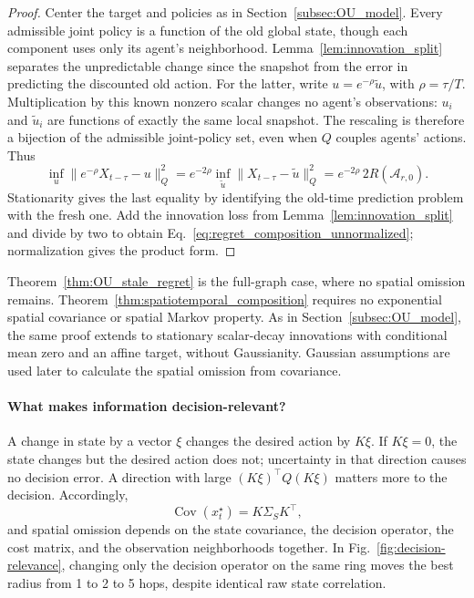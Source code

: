 \documentclass[11pt]{article}
\begin{document}
\begin{proof}
Center the target and policies as in Section~\ref{subsec:OU_model}.
Every admissible joint policy is a function of the old global state, though
each component uses only its agent's neighborhood. Lemma~\ref{lem:innovation_split}
separates the unpredictable change since the snapshot from the error in
predicting the discounted old action. For the latter, write
$u=e^{-\rho}\widetilde u$, with $\rho=\tau/T$. Multiplication by this
known nonzero scalar changes no agent's observations: $u_i$ and
$\widetilde u_i$ are functions of exactly the same local snapshot.
The rescaling is therefore a bijection of the admissible joint-policy set,
even when $Q$ couples agents' actions. Thus
\[
\inf_u\|e^{-\rho}X_{t-\tau}-u\|_Q^2
=e^{-2\rho}\inf_{\widetilde u}\|X_{t-\tau}-\widetilde u\|_Q^2
=e^{-2\rho}\,2R(\mathcal A_{r,0}).
\]
Stationarity gives the last equality by identifying the old-time prediction
problem with the fresh one. Add the innovation loss from Lemma~\ref{lem:innovation_split}
and divide by two to obtain Eq.~\eqref{eq:regret_composition_unnormalized};
normalization gives the product form.
\end{proof}

Theorem~\ref{thm:OU_stale_regret} is the full-graph case, where no spatial
omission remains. Theorem~\ref{thm:spatiotemporal_composition} requires no
exponential spatial covariance or spatial Markov property. As in Section~\ref{subsec:OU_model},
the same proof extends to stationary scalar-decay innovations with conditional
mean zero and an affine target, without Gaussianity. Gaussian assumptions
are used later to calculate the spatial omission from covariance.

\paragraph{What makes information decision-relevant?}
\label{subsec:decision_relevant_smoothness}
A change in state by a vector $\xi$ changes the desired action by $K\xi$.
If $K\xi=0$, the state changes but the desired action does not; uncertainty
in that direction causes no decision error. A direction with large
$(K\xi)^\top Q(K\xi)$ matters more to the decision. Accordingly,
\begin{equation}
\operatorname{Cov}(x_t^\star)=K\Sigma_S K^\top,
\label{eq:decision_covariance}
\end{equation}
and spatial omission depends on the state covariance, the decision operator,
the cost matrix, and the observation neighborhoods together. In
Fig.~\ref{fig:decision-relevance}, changing only the decision operator on
the same ring moves the best radius from 1 to 2 to 5 hops, despite identical
raw state correlation.
\end{document}
